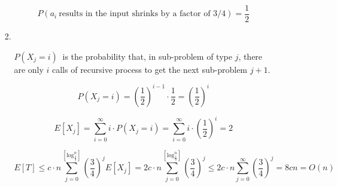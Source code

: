 \documentclass[11pt]{article}
\begin{document}
\begin{enumerate}
\begin{enumerate}
\begin{enumerate}
$$P(a_i\ \text{results in the input shrinks by a factor of 3/4})=\frac{1}{2}$$

\item 

\

$P(X_j = i)\ $ is the probability that, in sub-problem of type $j$, there are only $i$ calls of recursive process to get the next sub-problem $j+1$.

$$P(X_j=i)=(\frac{1}{2})^{i-1} \cdot \frac{1}{2} = (\frac{1}{2})^i$$

$$E[X_j]=\sum_{i=0}^{\infty} i\cdot P(X_j=i)=\sum_{i=0}^{\infty} i \cdot(\frac{1}{2})^i=2$$

$$E[T]\leq c \cdot n\sum_{j=0}^{[\text{log}_\frac{4}{3}^n]} (\frac{3}{4})^j E[X_j]=2c \cdot n\sum_{j=0}^{[\text{log}_\frac{4}{3}^n]}  (\frac{3}{4})^j \leq 2c \cdot n\sum_{j=0}^{\infty}  (\frac{3}{4})^j =8cn=O(n)$$









\end{enumerate}
\end{enumerate}









	
\end{enumerate}
\end{document}
